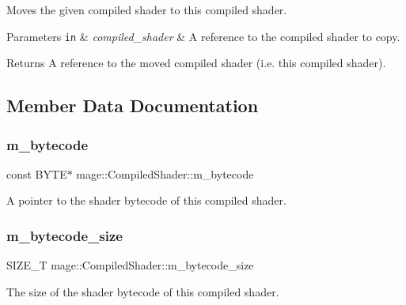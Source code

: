 Moves the given compiled shader to this compiled shader.


\begin{DoxyParams}[1]{Parameters}
\mbox{\tt in}  & {\em compiled\+\_\+shader} & A reference to the compiled shader to copy. \\
\hline
\end{DoxyParams}
\begin{DoxyReturn}{Returns}
A reference to the moved compiled shader (i.\+e. this compiled shader). 
\end{DoxyReturn}


\subsection{Member Data Documentation}
\hypertarget{structmage_1_1_compiled_shader_af4b0b541b5a2fb5c527242b8ed35f489}{}\label{structmage_1_1_compiled_shader_af4b0b541b5a2fb5c527242b8ed35f489} 
\subsubsection{\texorpdfstring{m\+\_\+bytecode}{m\_bytecode}}
{\footnotesize\ttfamily const B\+Y\+TE$\ast$ mage\+::\+Compiled\+Shader\+::m\+\_\+bytecode\hspace{0.3cm}{\ttfamily [private]}}

A pointer to the shader bytecode of this compiled shader. \hypertarget{structmage_1_1_compiled_shader_a0c1217abcfd049bf57cb1570126a8d04}{}\label{structmage_1_1_compiled_shader_a0c1217abcfd049bf57cb1570126a8d04} 
\subsubsection{\texorpdfstring{m\+\_\+bytecode\+\_\+size}{m\_bytecode\_size}}
{\footnotesize\ttfamily S\+I\+Z\+E\+\_\+T mage\+::\+Compiled\+Shader\+::m\+\_\+bytecode\+\_\+size\hspace{0.3cm}{\ttfamily [private]}}

The size of the shader bytecode of this compiled shader. \hypertarget{structmage_1_1_compiled_shader_aaa931468123884bbed243e2f5487f35a}{}\label{structmage_1_1_compiled_shader_aaa931468123884bbed243e2f5487f35a} 
